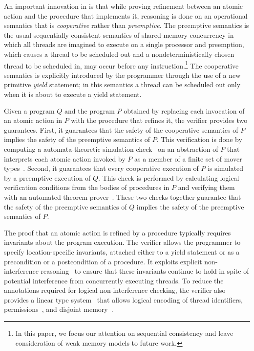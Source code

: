 An important innovation in \civl is that while proving refinement between an atomic action and the procedure that implements it,
reasoning is done on an operational semantics that is {\em cooperative\/} rather than {\em preemptive\/}.
The preemptive semantics is the usual sequentially consistent semantics of shared-memory concurrency in which all threads are imagined
to execute on a single processor and preemption, which causes a thread to be scheduled out and a nondeterministically chosen thread to 
be scheduled in, may occur before any instruction.\footnote{In this paper, 
we focus our attention on sequential consistency and leave consideration of weak memory models to future work.}
The cooperative semantics is explicitly introduced by the programmer through the use of a new primitive {\em yield\/} statement;
in this semantics a thread can be scheduled out only when it is about to execute a yield statement.

Given a program $Q$ and the program $P$ obtained by replacing each invocation of an atomic action in $P$ 
with the procedure that refines it, the \civl verifier provides two guarantees.
First, it guarantees that the safety of the cooperative semantics of $P$ implies the safety of the preemptive semantics of $P$.
This verification is done by computing a automata-theoretic simulation check~\cite{HenzingerHK95} 
on an abstraction of $P$ that interprets each atomic action invoked by $P$ 
as a member of a finite set of mover types~\cite{FlanaganFLQ08}.
Second, it guarantees that every cooperative execution of $P$ is simulated by a preemptive execution of $Q$.
This check is performed by calculating logical verification conditions from the bodies of procedures in $P$ and 
verifying them with an automated theorem prover~\cite{MouraB08}.
These two checks together guarantee that the 
safety of the preemptive semantics of $Q$ implies the safety of the preemptive semantics of $P$.

The proof that an atomic action is refined by a procedure typically requires invariants about the program execution.
The \civl verifier allows the programmer to specify location-specific invariants, attached either to a yield statement
or as a precondition or a postcondition of a procedure.  
It exploits explicit non-interference reasoning~\cite{OwickiGries76} to ensure that
these invariants continue to hold in spite of potential interference from concurrently executing threads.
To reduce the annotations required for logical non-interference checking, 
the \civl verifier also provides a linear type system~\cite{Wadler90lineartypes} 
that allows logical encoding of thread identifiers, permissions~\cite{boyland:03fractions}, 
and disjoint memory~\cite{LahiriQW11}.

